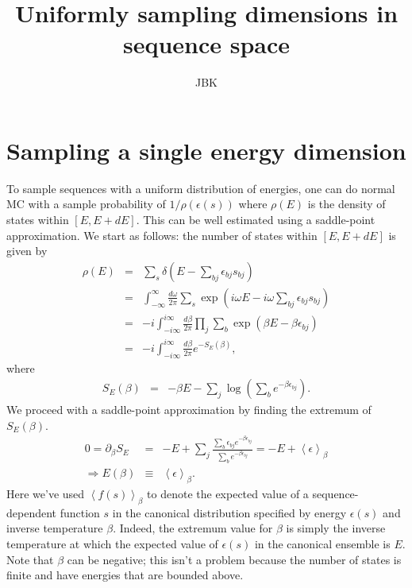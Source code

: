 \documentclass[11pt]{article}
\title{Uniformly sampling dimensions in sequence space}
\author{JBK}
\newcommand{\bea}{\begin{eqnarray}}
\newcommand{\eea}{\end{eqnarray}}
\newcommand{\braket}[1]{\left \langle #1 \right \rangle}
\begin{document}
\maketitle

\section*{Sampling a single energy dimension}

To sample sequences with a uniform distribution of energies, one can do normal MC with a sample probability of $1/\rho(\epsilon(s))$ where $\rho(E)$ is the density of states within $[E, E+dE]$. This can be well estimated using a saddle-point approximation. We start as follows: the number of states within $[E, E+dE]$ is given by
\bea
\rho(E) & = &  \sum_{s} \delta \left(E - \sum_{bj} \epsilon_{bj} s_{bj} \right) \\
& = &  \int_{-\infty}^{\infty} \frac{d \omega}{2 \pi} \sum_{s} \exp \left( i \omega E - i \omega \sum_{bj} \epsilon_{bj} s_{bj} \right) \\
& = & -i  \int_{- i \infty}^{i \infty} \frac{d \beta}{2 \pi} \prod_j \sum_b \exp \left( \beta E - \beta \epsilon_{bj} \right) \\
& = & -i  \int_{- i \infty}^{i \infty} \frac{d \beta}{2 \pi} e^{-S_E(\beta)}, 
\eea
where
\bea
S_E (\beta) &=& - \beta E - \sum_j \log \left( \sum_b e^{- \beta \epsilon_{bj}} \right). 
\eea
We proceed with a saddle-point approximation by finding the extremum of $S_E(\beta)$. 
\bea
0 = \partial_{\beta} S_E &=& - E + \sum_j \frac{\sum_b \epsilon_{bj} e^{- \beta \epsilon_{bj}} }{\sum_b e^{-\beta \epsilon_{bj}} } = - E + \braket{\epsilon}_{\beta} \\
\Rightarrow E(\beta)  &\equiv&  \braket{\epsilon}_{\beta} .
\eea
Here we've used $\braket{f(s)}_{\beta}$ to denote the expected value of a sequence-dependent function $s$ in the canonical distribution specified by energy $\epsilon(s)$ and inverse temperature $\beta$. Indeed, the extremum value for $\beta$ is simply the inverse temperature at which the expected value of $\epsilon(s)$ in the canonical ensemble is $E$.  Note that $\beta$ can be negative; this isn't a problem because the number of states is finite and have energies that are bounded above.
\end{document}
